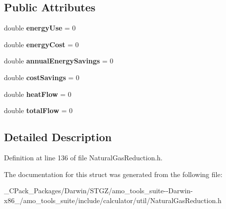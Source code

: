 \subsection*{Public Attributes}
\begin{DoxyCompactItemize}
\item 
\mbox{\label{struct_natural_gas_reduction_1_1_output_a96e4bb57892801a41a54b8af859b890c}} 
double {\bfseries energy\+Use} = 0
\item 
\mbox{\label{struct_natural_gas_reduction_1_1_output_a78c635b987327e2f9ac9516cd4165934}} 
double {\bfseries energy\+Cost} = 0
\item 
\mbox{\label{struct_natural_gas_reduction_1_1_output_ad59df80b63f8ea9611de365d251575a5}} 
double {\bfseries annual\+Energy\+Savings} = 0
\item 
\mbox{\label{struct_natural_gas_reduction_1_1_output_a164319088322802a54d57602c3aced51}} 
double {\bfseries cost\+Savings} = 0
\item 
\mbox{\label{struct_natural_gas_reduction_1_1_output_aa9a6b165ff9f0d30fbff29f0ad133865}} 
double {\bfseries heat\+Flow} = 0
\item 
\mbox{\label{struct_natural_gas_reduction_1_1_output_aa1ce963b3196d38b54c9063f56e3d1d3}} 
double {\bfseries total\+Flow} = 0
\end{DoxyCompactItemize}


\subsection{Detailed Description}


Definition at line 136 of file Natural\+Gas\+Reduction.\+h.



The documentation for this struct was generated from the following file\+:\begin{DoxyCompactItemize}
\item 
\+\_\+\+C\+Pack\+\_\+\+Packages/\+Darwin/\+S\+T\+G\+Z/amo\+\_\+tools\+\_\+suite-\/-\/\+Darwin-\/x86\+\_/amo\+\_\+tools\+\_\+suite/include/calculator/util/Natural\+Gas\+Reduction.\+h\end{DoxyCompactItemize}
